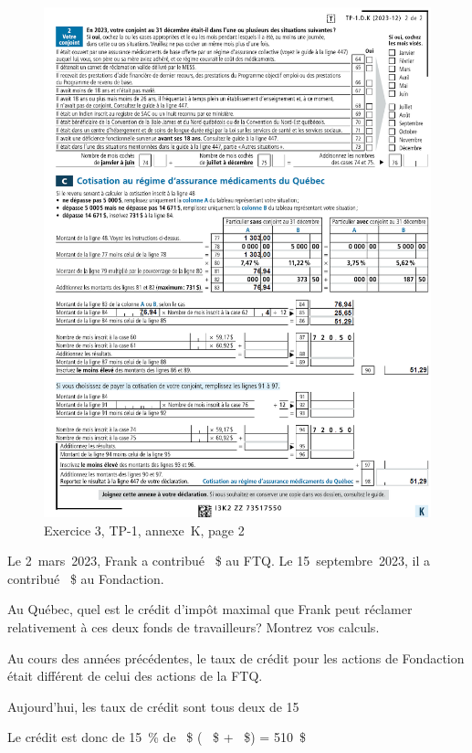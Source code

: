 \begin{figure}
	\centering
	\includegraphics[width=.9\textwidth]{exercice/5-3/Q4/AnnexeK-page2.png}
	\caption[]{Exercice 3, TP-1, annexe~K, page 2}
	\label{fig:chap5Exercice3Q4K2}
\end{figure}
\begin{question}
	Le 2~mars~2023, Frank a contribué ~\$ au FTQ. Le 15~septembre~2023, il a contribué ~\$ au Fondaction.
	
	Au Québec, quel est le crédit d'impôt maximal que Frank peut réclamer relativement à ces deux fonds de travailleurs? Montrez vos calculs.
\end{question}
Au cours des années précédentes, le taux de crédit pour les actions de Fondaction était différent de celui des actions de la FTQ.

Aujourd'hui, les taux de crédit sont tous deux de 15 %

Le crédit est donc de 15~\% de ~\$ ( ~\$ + ~\$) = 510~\$


